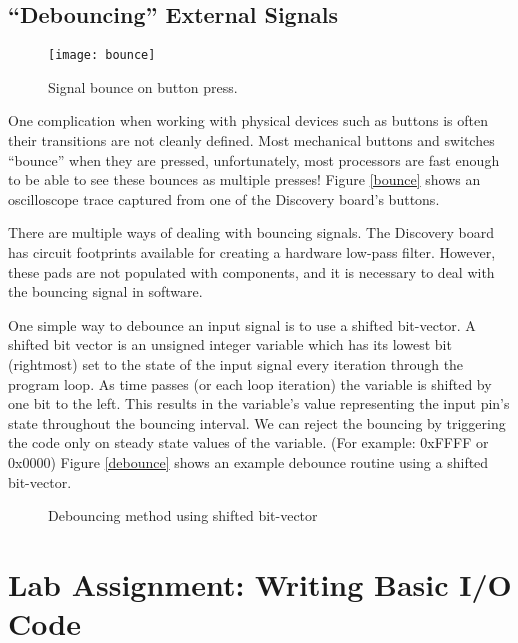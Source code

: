 \documentclass[11pt,fleqn]{book} %
\newcommand{\code}[3]{
    \begin{figure}[]
        \begin{center}
            \hspace*{-3.4cm}
            \colorbox{gray!20!white}{
                \parbox{0.8\paperwidth} {
                    
                }
            }
            \caption{#2}
            \label{#3}
        \end{center}
    \end{figure}
}
\begin{document}
\subsection{``Debouncing'' External Signals} \label{bounce_section}

\begin{figure}[]
    \centering\texttt{[image: bounce]}
    \caption{Signal bounce on button press.}
    \label{bounce}
\end{figure}

One complication when working with physical devices such as buttons is often their transitions are not cleanly defined. Most mechanical buttons and switches ``bounce'' when they are pressed, unfortunately, most processors are fast enough to be able to see these bounces as multiple presses! Figure \vref{bounce} shows an oscilloscope trace captured from one of the Discovery board's buttons.

There are multiple ways of dealing with bouncing signals. The Discovery board has circuit footprints available for creating a hardware low-pass filter. However, these pads are not populated with components, and it is necessary to deal with the bouncing signal in software.

One simple way to debounce an input signal is to use a shifted bit-vector. A shifted bit vector is an unsigned integer variable which has its lowest bit (rightmost) set to the state of the input signal every iteration through the program loop. As time passes (or each loop iteration) the variable is shifted by one bit to the left. This results in the variable's value representing the input pin's state throughout the bouncing interval. We can reject the bouncing by triggering the code only on steady state values of the variable. (For example: 0xFFFF or 0x0000) Figure \vref{debounce} shows an example debounce routine using a shifted bit-vector.

\code{./files/debounce.c}{Debouncing method using shifted bit-vector}{debounce}

\section{Lab Assignment: Writing Basic I/O Code}
\end{document}
